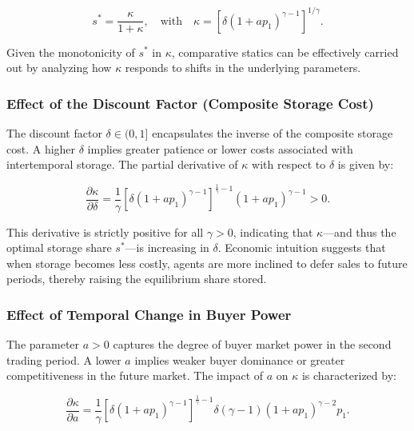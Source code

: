 \begin{equation}
    s^* = \frac{\kappa}{1+\kappa}, \quad \text{with} \quad \kappa = \left[ \delta (1+ap_1)^{\gamma-1} \right]^{1/\gamma}.
    \label{Eq: optimal storage share, in form of kappa}
\end{equation}

Given the monotonicity of $s^*$ in $\kappa$, comparative statics can be effectively carried out by analyzing how $\kappa$ responds to shifts in the underlying parameters.

\subsubsection{Effect of the Discount Factor (Composite Storage Cost)}

\noindent The discount factor $\delta \in (0,1]$ encapsulates the inverse of the composite storage cost. A higher $\delta$ implies greater patience or lower costs associated with intertemporal storage. The partial derivative of $\kappa$ with respect to $\delta$ is given by:

\begin{equation}
    \frac{\partial \kappa}{\partial \delta} = \frac{1}{\gamma} \left[ \delta (1+ap_1)^{\gamma-1} \right]^{\frac{1}{\gamma} - 1} (1+ap_1)^{\gamma-1} > 0.
\end{equation}

This derivative is strictly positive for all $\gamma > 0$, indicating that $\kappa$—and thus the optimal storage share $s^*$—is increasing in $\delta$. Economic intuition suggests that when storage becomes less costly, agents are more inclined to defer sales to future periods, thereby raising the equilibrium share stored.

\subsubsection{Effect of Temporal Change in Buyer Power}

\noindent The parameter $a > 0$ captures the degree of buyer market power in the second trading period. A lower $a$ implies weaker buyer dominance or greater competitiveness in the future market. The impact of $a$ on $\kappa$ is characterized by:

\begin{equation}
    \frac{\partial \kappa}{\partial a} = \frac{1}{\gamma} \left[ \delta (1+ap_1)^{\gamma-1} \right]^{\frac{1}{\gamma} - 1} \delta (\gamma-1) (1+ap_1)^{\gamma-2} p_1.
\end{equation}

